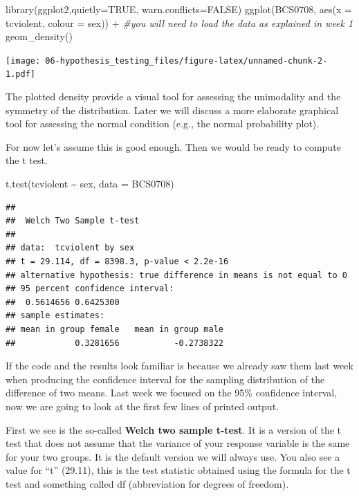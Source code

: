 \documentclass[
]{book}
\newenvironment{Shaded}{\begin{snugshade}}{\end{snugshade}}
\newcommand{\AttributeTok}[1]{\textcolor[rgb]{0.77,0.63,0.00}{#1}}
\newcommand{\CommentTok}[1]{\textcolor[rgb]{0.56,0.35,0.01}{\textit{#1}}}
\newcommand{\ConstantTok}[1]{\textcolor[rgb]{0.00,0.00,0.00}{#1}}
\newcommand{\FunctionTok}[1]{\textcolor[rgb]{0.00,0.00,0.00}{#1}}
\newcommand{\NormalTok}[1]{#1}
\newcommand{\SpecialCharTok}[1]{\textcolor[rgb]{0.00,0.00,0.00}{#1}}
\begin{document}
\begin{Shaded}
\begin{Highlighting}[]
\FunctionTok{library}\NormalTok{(ggplot2,}\AttributeTok{quietly=}\ConstantTok{TRUE}\NormalTok{, }\AttributeTok{warn.conflicts=}\ConstantTok{FALSE}\NormalTok{)}
\FunctionTok{ggplot}\NormalTok{(BCS0708, }\FunctionTok{aes}\NormalTok{(}\AttributeTok{x =}\NormalTok{ tcviolent, }\AttributeTok{colour =}\NormalTok{ sex)) }\SpecialCharTok{+} \CommentTok{\#you will need to load the data as explained in week 1}
  \FunctionTok{geom\_density}\NormalTok{() }
\end{Highlighting}
\end{Shaded}

\texttt{[image: 06-hypothesis\_testing\_files/figure-latex/unnamed-chunk-2-1.pdf]}

The plotted density provide a visual tool for assessing the unimodality and the symmetry of the distribution. Later we will discuss a more elaborate graphical tool for assessing the normal condition (e.g., the normal probability plot).

For now let's assume this is good enough. Then we would be ready to compute the t test.

\begin{Shaded}
\begin{Highlighting}[]
\FunctionTok{t.test}\NormalTok{(tcviolent }\SpecialCharTok{\textasciitilde{}}\NormalTok{ sex, }\AttributeTok{data =}\NormalTok{ BCS0708)}
\end{Highlighting}
\end{Shaded}

\begin{verbatim}
## 
##  Welch Two Sample t-test
## 
## data:  tcviolent by sex
## t = 29.114, df = 8398.3, p-value < 2.2e-16
## alternative hypothesis: true difference in means is not equal to 0
## 95 percent confidence interval:
##  0.5614656 0.6425300
## sample estimates:
## mean in group female   mean in group male 
##            0.3281656           -0.2738322
\end{verbatim}

If the code and the results look familiar is because we already saw them last week when producing the confidence interval for the sampling distribution of the difference of two means. Last week we focused on the 95\% confidence interval, now we are going to look at the first few lines of printed output.

First we see is the so-called \textbf{Welch two sample t-test}. It is a version of the t test that does not assume that the variance of your response variable is the same for your two groups. It is the default version we will always use. You also see a value for ``t'' (29.11), this is the test statistic obtained using the formula for the t test and something called df (abbreviation for degrees of freedom).
\end{document}
